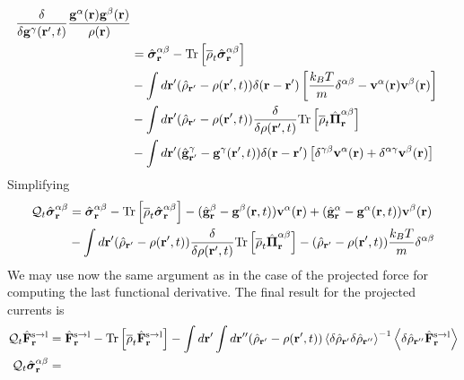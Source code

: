 \documentclass[b5paper,openright,10pt]{book}
\newcommand{\llangle}{\left\langle}
\newcommand{\rrangle}{\right\rangle}
\begin{document}
\begin{appendices}
\begin{align}
\frac{\delta}{\delta {\bf g}^\gamma({\bf r}',t)}
\frac{{\bf g}^\alpha({\bf r}){\bf g}^\beta({\bf r})}{\rho({\bf r})}
\nonumber\\
&=
\hat{\boldsymbol{\sigma}}^{\alpha\beta}_{{\bf r}}-{\rm Tr}\left[\overline{\rho}_t\hat{\boldsymbol{\sigma}}^{\alpha\beta}_{{\bf r}}\right]
\nonumber\\
&-\int d{\bf r}'(\hat{\rho}_{{\bf r}'}-\rho({\bf r}',t))
\delta({\bf r}-{\bf r}') \left[\frac{k_BT}{m}\delta^{\alpha\beta}-{\bf v}^\alpha({\bf r}){\bf v}^\beta({\bf r})\right]
\nonumber\\
&-\int d{\bf r}'(\hat{\rho}_{{\bf r}'}-\rho({\bf r}',t))
\frac{\delta}{\delta \rho({\bf r}',t)}
{\rm Tr}\left[\overline{\rho}_{t} \hat{\boldsymbol{\Pi}}^{\alpha\beta}_{{\bf r}}\right]
\nonumber\\
&-\int d{\bf r}'(\hat{\bf g}^\gamma_{{\bf r}'}-{\bf g}^\gamma({\bf r}',t))\delta({\bf r}-{\bf r}')
\left[\delta^{\gamma\beta}{\bf v}^\alpha({\bf r})+\delta^{\alpha\gamma}{\bf v}^\beta({\bf r})\right]
\label{QS2}
\end{align}
Simplifying
\begin{align}
  {\cal Q}_t\hat{\boldsymbol{\sigma}}^{\alpha\beta}_{{\bf r}}&=
\hat{\boldsymbol{\sigma}}^{\alpha\beta}_{{\bf r}}-{\rm Tr}\left[\overline{\rho}_t\hat{\boldsymbol{\sigma}}^{\alpha\beta}_{{\bf r}}\right]
-(\hat{\bf g}^\beta_{{\bf r}}-{\bf g}^\beta({\bf r},t))
{\bf v}^\alpha({\bf r})+
(\hat{\bf g}^\alpha_{{\bf r}}-{\bf g}^\alpha({\bf r},t))
{\bf v}^\beta({\bf r})
\nonumber\\
&-\int d{\bf r}'(\hat{\rho}_{{\bf r}'}-\rho({\bf r}',t))
\frac{\delta}{\delta \rho({\bf r}',t)}
{\rm Tr}\left[\overline{\rho}_{t} \hat{\boldsymbol{\Pi}}^{\alpha\beta}_{{\bf r}}\right]
-(\hat{\rho}_{{\bf r}'}-\rho({\bf r}',t))\frac{k_BT}{m}\delta^{\alpha\beta}
\label{QS3}
\end{align}
We may use now the same argument as in the case of the projected force
for computing the last functional derivative. The final result for the
projected currents is
\begin{align}
    {\cal Q}_t\hat{\bf F}^{\rm s\to l}_{{\bf r}}&=
\hat{\bf F}^{\rm s\to l}_{{\bf r}}- {\rm Tr}\left[\overline{\rho}_{t} \hat{\bf F}^{\rm s\to l}_{{\bf r}}\right]
-\int d{\bf r}'\int d{\bf r}''(\hat{\rho}_{{\bf r}'}-{\rho}({\bf r}',t))
\llangle \delta\hat{\rho}_{{\bf r}'}\delta\hat{\rho}_{{\bf r}''}\rrangle^{-1}
\llangle \delta \hat{\rho}_{{\bf r}''}\hat{\bf F}^{\rm s\to l}_{{\bf r}}\rrangle
\nonumber\\
  {\cal Q}_t\hat{\boldsymbol{\sigma}}^{\alpha\beta}_{{\bf r}}&=

\end{align}
\end{appendices}
\end{document}
